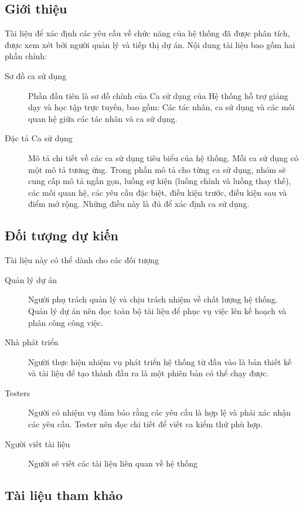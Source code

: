 \documentclass[./../main_file.tex]{subfiles}
\begin{document}
	\subsection{Giới thiệu}
	Tài liệu để xác định các yêu cầu về chức năng của hệ thống đã được phân tích, được xem xét bởi người quản lý và tiếp thị dự án.
	Nội dung tài liệu bao gồm hai phần chính:
	\begin{description}
		\item[Sơ đồ ca sử dụng] Phần đầu tiên là sơ đồ chính của Ca sử dụng của Hệ thống hỗ trợ giảng dạy và học tập trực tuyến, bao gồm: Các tác nhân, ca sử dụng và các mối quan hệ giữa các tác nhân và ca sử dụng.
		\item [Đặc tả Ca sử dụng] Mô tả chi tiết về các ca sử dụng tiêu biểu của hệ thống. Mỗi ca sử dụng có một mô tả tương ứng. Trong phần mô tả cho từng ca sử dụng, nhóm sẽ cung cấp mô tả ngắn gọn, luồng sự kiện (luồng chính và luồng thay thế), các mối quan hệ, các yêu cầu đặc biệt, điều kiện trước, điều kiện sau và điểm mở rộng. Những điều này là đủ để xác định ca sử dụng.
	\end{description}
	\subsection{Đối tượng dự kiến}
	Tài liệu này có thể dành cho các đối tượng
	\begin{description}
		\item [Quản lý dự án] Người phụ trách quản lý và chịu trách nhiệm về chất lượng hệ thống. Quản lý dự án nên đọc toàn bộ tài liệu để phục vụ việc lên kế hoạch và phân công công việc.
		\item [Nhà phát triển] Người thực hiện nhiệm vụ phát triển hệ thống từ đầu vào là bản thiết kế và tài liệu để tạo thành đầu ra là một phiên bản có thể chạy được.
		\item [Testers] Người có nhiệm vụ đảm bảo rằng các yêu cầu là hợp lệ và phải xác nhận các yêu cầu. Tester nên đọc chi tiết để viết ca kiểm thử phù hợp.
		\item [Người viết tài liệu] Người sẽ viết các tài liệu liên quan về hệ thống
	\end{description}
	\subsection{Tài liệu tham khảo}
	\nocite{*}
	\printbibliography[heading=none]
	
\end{document}
